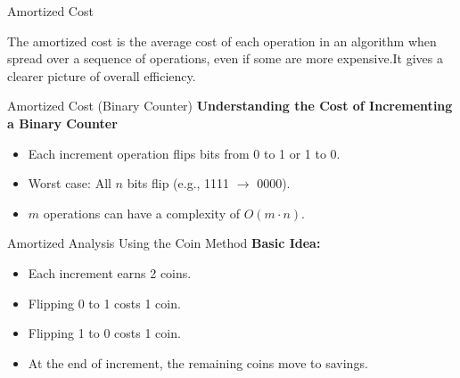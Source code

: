 \documentclass{beamer}
\begin{document}
\begin{frame} {Amortized Cost}
    \begin{itemize}
    \begin{tcolorbox}[colback=gray!10,colframe=red!75!black,title=Amortized Cost]
        \text The amortized cost is the average cost of each operation in an algorithm when spread over a sequence of operations, even if some are more expensive.It gives a clearer picture of overall efficiency.
    \end{tcolorbox}
    \end{itemize}
\end{frame}

\begin{frame}{Amortized Cost (Binary Counter)}
    \textbf{Understanding the Cost of Incrementing a Binary Counter}
    \begin{itemize}
        \item Each increment operation flips bits from 0 to 1 or 1 to 0.
        \item Worst case: All $n$ bits flip (e.g., 1111 $\to$ 0000).
        \item $m$ operations can have a complexity of $O(m \cdot n)$.
    \end{itemize}
\end{frame}

\begin{frame}{Amortized Analysis Using the Coin Method}
    \textbf{Basic Idea:}
    \begin{itemize}
        \item Each increment earns 2 coins.
        \item Flipping 0 to 1 costs 1 coin.
        \item Flipping 1 to 0 costs 1 coin.
        \item At the end of increment, the remaining coins move to savings.
    \end{itemize}
\end{frame}
\end{document}

